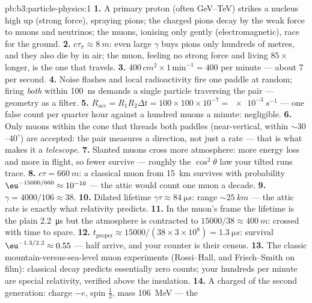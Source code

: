 \begin{solution}{pb:b3:particle-physics:1}
\textbf{1.} A primary proton (often \unit{GeV}--\unit{TeV})
strikes a nucleus high up (strong force), spraying pions; the
charged pions decay by the weak force to muons and neutrinos;
the muons, ionising only gently (electromagnetic), race for the
ground.
\textbf{2.} $c\tau_\pi \approx \qty{8}{m}$: even large $\gamma$
buys pions only hundreds of metres, and they also die by  in air; the muon, feeling no strong force and
living $85\times$ longer, is the one that travels.
\textbf{3.} $400\,\unit{cm^2}\times1\,\text{min}^{-1} = 400$
per minute --- about 7 per second.
\textbf{4.} Noise flashes and local radioactivity fire one
paddle at random; firing \emph{both} within \qty{100}{ns}
demands a single particle traversing the pair --- geometry as a
filter.
\textbf{5.} $R_{\text{acc}} = R_1R_2\Delta t = 100\times100
\times10^{-7} = \qty{e-3}{s^{-1}}$ --- one false count per
quarter hour against a hundred muons a minute: negligible.
\textbf{6.} Only muons within the cone that threads both
paddles (near-vertical, within ${\sim}30$--$40^\circ$) are
accepted: the pair measures a direction, not just a rate ---
that is what makes it a \emph{telescope}.
\textbf{7.} Slanted muons cross more atmosphere: more energy
loss and more  in flight, so fewer survive ---
roughly the $\cos^2\theta$ law your tilted runs trace.
\textbf{8.} $c\tau = \qty{660}{m}$: a classical muon from
\qty{15}{km} survives with probability
$\eu^{-15000/660} \approx 10^{-10}$ --- the attic would count
one muon a decade.
\textbf{9.} $\gamma = 4000/106 \approx 38$.
\textbf{10.} Dilated lifetime $\gamma\tau \approx
\qty{84}{\micro s}$: range ${\sim}\qty{25}{km}$ --- the attic
rate is exactly what relativity predicts.
\textbf{11.} In the muon's frame the lifetime is the plain
\qty{2.2}{\micro s} but the atmosphere is contracted to
$15000/38 \approx \qty{400}{m}$: crossed with time to spare.
\textbf{12.} $t_{\text{proper}} \approx 15000/(38\times3\times
10^8) = \qty{1.3}{\micro s}$: survival $\eu^{-1.3/2.2} \approx
0.55$ --- half arrive, and your counter is their census.
\textbf{13.} The classic mountain-versus-sea-level muon
experiments (Rossi--Hall, and Frisch--Smith on film): classical
decay predicts essentially zero counts; your hundreds per
minute are special relativity, verified above the insulation.
\textbf{14.} A charged  of the second generation:
charge $-e$, spin $\tfrac12$, mass \qty{106}{MeV} --- the

\end{solution}
